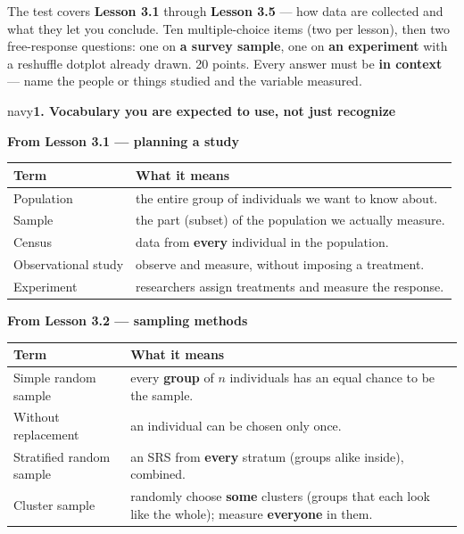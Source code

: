 \documentclass[12pt]{article}
\newcommand{\sghead}[2][10]{%
  \vspace{0.13in}
  \boxguard[#1]
  \begin{headlinebox}{navy}\color{white}\bfseries\small #2\end{headlinebox}
  \vspace{0.09in}}
\begin{document}

\vspace{0.12in}

\boxguard[8]
\begin{remindbox}
\small
The test covers \textbf{Lesson 3.1} through \textbf{Lesson 3.5} --- how data are collected and
what they let you conclude. Ten multiple-choice items (two per lesson), then two free-response
questions: one on \textbf{a survey sample}, one on \textbf{an experiment} with a reshuffle
dotplot already drawn. 20 points. Every answer must be \textbf{in context} --- name the people or
things studied and the variable measured.
\end{remindbox}

\sghead{1. Vocabulary you are expected to use, not just recognize}

\small
\renewcommand{\arraystretch}{1.15}

\textbf{From Lesson 3.1 --- planning a study}
\par\vspace{3pt}
\noindent\begin{tabularx}{\linewidth}{@{} l X @{}}
\rowcolor{sky}
\textbf{Term} & \textbf{What it means} \\
\midrule
Population & the entire group of individuals we want to know about. \\
Sample & the part (subset) of the population we actually measure. \\
Census & data from \textbf{every} individual in the population. \\
Observational study & observe and measure, without imposing a treatment. \\
Experiment & researchers assign treatments and measure the response. \\
\end{tabularx}

\vspace{7pt}
\boxguard[9]
\textbf{From Lesson 3.2 --- sampling methods}
\par\vspace{3pt}
\noindent\begin{tabularx}{\linewidth}{@{} l X @{}}
\rowcolor{sky}
\textbf{Term} & \textbf{What it means} \\
\midrule
Simple random sample & every \textbf{group} of $n$ individuals has an equal chance to be the sample. \\
Without replacement & an individual can be chosen only once. \\
Stratified random sample & an SRS from \textbf{every} stratum (groups alike inside), combined. \\
Cluster sample & randomly choose \textbf{some} clusters (groups that each look like the
                   whole); measure \textbf{everyone} in them. \\
\end{tabularx}
\end{document}
